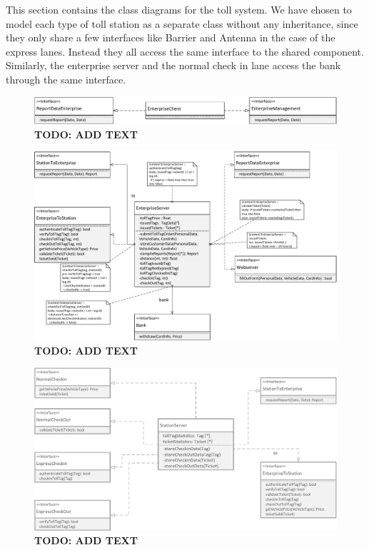 This section contains the class diagrams for the toll system. We have chosen to model each type of toll station as a separate class without any inheritance, since they only share a few interfaces like Barrier and Antenna in the case of the express lanes. Instead they all access the same interface to the shared component. Similarly, the enterprise server and the normal check in lane access the bank through the same interface.

\begin{figure}[H]
\centerline{\includegraphics[width=\textwidth]{img/class_diagrams/class_diagram_enterprise_client}}
\caption{\textbf{TODO: ADD TEXT}}
\label{fig:cld_ec}
\end{figure}

\begin{figure}[H]
\centerline{\includegraphics[width=\textwidth]{img/class_diagrams/class_diagram_enterprise_server}}
\caption{\textbf{TODO: ADD TEXT}}
\label{fig:cld_es}
\end{figure}

\begin{figure}[H]
\centerline{\includegraphics[width=\textwidth]{img/class_diagrams/class_diagram_station_server}}
\caption{\textbf{TODO: ADD TEXT}}
\label{fig:cld_ss}
\end{figure}

